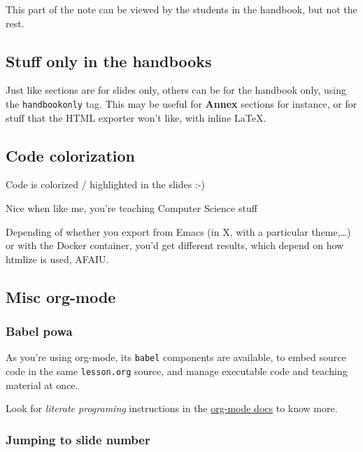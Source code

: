 \documentclass[a4paper]{article}
\begin{document}
\begin{NOTES}


This part of the note can be viewed by the students in the handbook,
but not the rest.
\end{NOTES}

\subsection{Stuff only in the handbooks}
\label{sec:orgabab667}

Just like sections are for slides only, others can be for the handbook
only, using the \texttt{handbookonly} tag. This may be useful for \textbf{Annex}
sections for instance, or for stuff that the HTML exporter won't like, with inline \LaTeX{}.

\subsection{Code colorization}
\label{sec:org7c88f69}
Code is colorized / highlighted in the slides :-)

\begin{NOTES}
Nice when like me, you're teaching Computer Science stuff

Depending of whether you export from Emacs (in X, with a particular
theme,\ldots{}) or with the Docker container, you'd get different results,
which depend on how htmlize is used, AFAIU.
\end{NOTES}

\subsection{Misc org-mode}
\label{sec:org241a133}

\subsubsection{Babel powa}
\label{sec:org1151c51}
As you're using org-mode, its \texttt{babel} components are available, to embed source code in the same \texttt{lesson.org} source, and manage executable code and teaching material at once.

Look for \emph{literate programing} instructions in the \href{http://orgmode.org/manual/Working-with-source-code.html}{org-mode docs} to know more.

\subsubsection{Jumping to slide number}
\label{sec:org16b5809}
\end{document}
